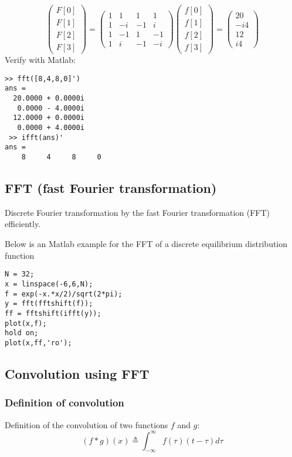 \documentclass[11pt]{amsart}
\begin{document}
$$
\left( \begin{array}{c}{F[0]} \\ {F[1]} \\ {F[2]} \\ {F[3]}\end{array}\right)=\left( \begin{array}{cccc}{1} & {1} & {1} & {1} \\ {1} & {-i} & {-1} & {i} \\ {1} & {-1} & {1} & {-1} \\ {1} & {i} & {-1} & {-i}\end{array}\right) \left( \begin{array}{c}{f[0]} \\ {f[1]} \\ {f[2]} \\ {f[3]}\end{array}\right)=\left( \begin{array}{c}{20} \\ {-i 4} \\ {12} \\ {i 4}\end{array}\right)
$$
Verify with Matlab:

 \begin{lstlisting}
>> fft([8,4,8,0]')
ans =
  20.0000 + 0.0000i
   0.0000 - 4.0000i
  12.0000 + 0.0000i
   0.0000 + 4.0000i   
 >> ifft(ans)'
ans =
    8     4     8     0
 \end{lstlisting}

\subsection{FFT (fast Fourier transformation)}

Discrete Fourier transformation by the fast Fourier transformation (FFT) efficiently. 

Below is an Matlab example for the FFT of a discrete equilibrium distribution function
 \begin{lstlisting}
N = 32;
x = linspace(-6,6,N);
f = exp(-x.*x/2)/sqrt(2*pi);
y = fft(fftshift(f));
ff = fftshift(ifft(y));
plot(x,f);
hold on;
plot(x,ff,'ro');
\end{lstlisting}
 


\subsection{Convolution using FFT}

\subsubsection{Definition of convolution}
Definition of the convolution of two functions $f$ and $g$:
\begin{equation*}
(f*g)(x) \triangleq \int_ {-\infty}^{\infty}f(\tau)(t-\tau)d\tau
\end{equation*}
\end{document}
